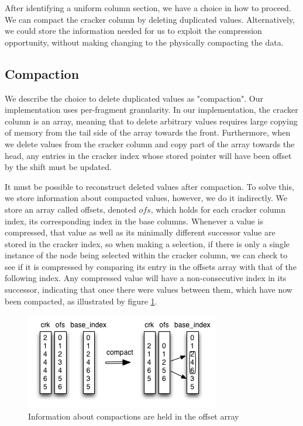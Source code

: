 After identifying a uniform column section, we have a choice in how to proceed. We can compact the cracker column by deleting duplicated values. Alternatively, we could store the information needed for us to exploit the compression opportunity, without making changing to the physically compacting the data.

\subsection{Compaction}

We describe the choice to delete duplicated values as "compaction". Our implementation uses per-fragment granularity. In our implementation, the cracker column is an array, meaning that to delete arbitrary values requires large copying of memory from the tail side of the array towards the front. Furthermore, when we delete values from the cracker column and copy part of the array towards the head, any entries in the cracker index whose stored pointer will have been offset by the shift must be updated.

It must be possible to reconstruct deleted values after compaction. To solve this, we store information about compacted values, however, we do it indirectly. We store an array called offsets, denoted $ofs$, which holds for each cracker column index, its corresponding index in the base columns. Whenever a value is compressed, that value as well as its minimally different successor value are stored in the cracker index, so when making a selection, if there is only a single instance of the node being selected within the cracker column, we can check to see if it is compressed by comparing its entry in the offsets array with that of the following index. Any compressed value will have a non-consecutive index in its successor, indicating that once there were values between them, which have now been compacted, as illustrated by figure \ref{fig:compaction_causes_non_consecutive_offset_entries}.

\begin{figure}[H]
  \centering
  \includegraphics[]{images/d4_compaction_storage}
  \caption{Information about compactions are held in the offset array}
  \label{fig:compaction_causes_non_consecutive_offset_entries}
\end{figure}


